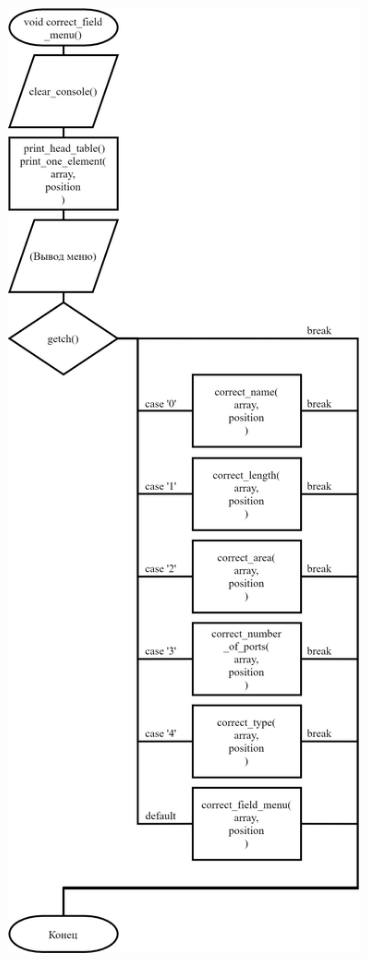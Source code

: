 \begin{figure}[!htp]
    \includegraphics[height=25cm]{../src/menu/correct_field/correct_field-2.png}
\end{figure}

